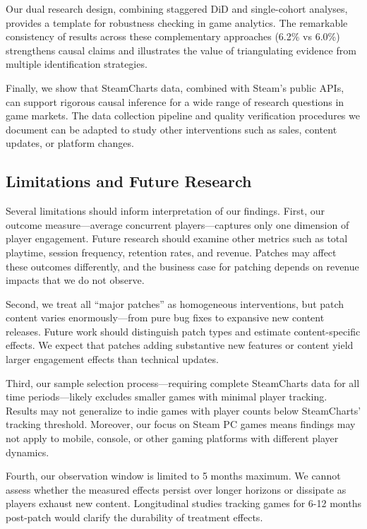 \documentclass[12pt,a4paper]{article}
\begin{document}
Our dual research design, combining staggered DiD and single-cohort analyses, provides a template for robustness checking in game analytics. The remarkable consistency of results across these complementary approaches (6.2\% vs 6.0\%) strengthens causal claims and illustrates the value of triangulating evidence from multiple identification strategies.

Finally, we show that SteamCharts data, combined with Steam's public APIs, can support rigorous causal inference for a wide range of research questions in game markets. The data collection pipeline and quality verification procedures we document can be adapted to study other interventions such as sales, content updates, or platform changes.

\subsection{Limitations and Future Research}

Several limitations should inform interpretation of our findings. First, our outcome measure---average concurrent players---captures only one dimension of player engagement. Future research should examine other metrics such as total playtime, session frequency, retention rates, and revenue. Patches may affect these outcomes differently, and the business case for patching depends on revenue impacts that we do not observe.

Second, we treat all ``major patches'' as homogeneous interventions, but patch content varies enormously---from pure bug fixes to expansive new content releases. Future work should distinguish patch types and estimate content-specific effects. We expect that patches adding substantive new features or content yield larger engagement effects than technical updates.

Third, our sample selection process---requiring complete SteamCharts data for all time periods---likely excludes smaller games with minimal player tracking. Results may not generalize to indie games with player counts below SteamCharts' tracking threshold. Moreover, our focus on Steam PC games means findings may not apply to mobile, console, or other gaming platforms with different player dynamics.

Fourth, our observation window is limited to 5 months maximum. We cannot assess whether the measured effects persist over longer horizons or dissipate as players exhaust new content. Longitudinal studies tracking games for 6-12 months post-patch would clarify the durability of treatment effects.
\end{document}
